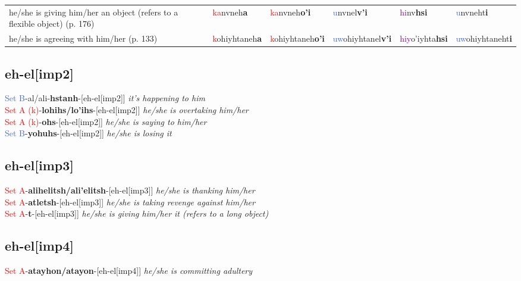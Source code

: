 \documentclass[oneside,openany]{book}%
\begin{document}
\begin{tabularx}{\textwidth}{>{\hsize=1.5\hsize\RaggedRight}X >{\hsize=0.9\hsize}X >{\hsize=0.9\hsize}X >{\hsize=0.9\hsize}X >{\hsize=0.9\hsize}X >{\hsize=0.9\hsize}X}
he/she is giving him/her an object (refers to a flexible object) (p. 176)&\textcolor{Red}{ka}nvneh\textbf{a}&\textcolor{Red}{ka}nvneh\textbf{o'i}&\textcolor{RoyalBlue}{u}nvnel\textbf{v'i}&\textcolor{Purple}{hi}nv\textbf{hsi}&\textcolor{RoyalBlue}{u}nvneht\textbf{i}\\%
he/she is agreeing with him/her (p. 133)&\textcolor{Red}{k}ohiyhtaneh\textbf{a}&\textcolor{Red}{k}ohiyhtaneh\textbf{o'i}&\textcolor{RoyalBlue}{uw}ohiyhtanel\textbf{v'i}&\textcolor{Purple}{hiy}o'iyhta\textbf{hsi}&\textcolor{RoyalBlue}{uw}ohiyhtaneht\textbf{i}\\%
\bottomrule%
\end{tabularx}%
\vspace{1em}%
\needspace{1in}%
\subsection*{eh-el[imp2]}%
\textcolor{RoyalBlue}{Set B}{-}al/ali{-}\textbf{hstanh}{-}[eh-el[imp2]] \textit{ it's happening to him} \\%
\textcolor{Red}{Set A (k)}{-}\textbf{lohihs/lo'ihs}{-}[eh-el[imp2]] \textit{ he/she is overtaking him/her} \\%
\textcolor{Red}{Set A (k)}{-}\textbf{ohs}{-}[eh-el[imp2]] \textit{ he/she is saying to him/her} \\%
\textcolor{RoyalBlue}{Set B}{-}\textbf{yohuhs}{-}[eh-el[imp2]] \textit{ he/she is losing it} \\%
\vspace{1em}%
\needspace{1in}%
\subsection*{eh-el[imp3]}%
\textcolor{Red}{Set A}{-}\textbf{alihelitsh/ali'elitsh}{-}[eh-el[imp3]] \textit{ he/she is thanking him/her} \\%
\textcolor{Red}{Set A}{-}\textbf{atletsh}{-}[eh-el[imp3]] \textit{ he/she is taking revenge against him/her} \\%
\textcolor{Red}{Set A}{-}\textbf{t}{-}[eh-el[imp3]] \textit{ he/she is giving him/her it (refers to a long object)} \\%
\vspace{1em}%
\needspace{1in}%
\subsection*{eh-el[imp4]}%
\textcolor{Red}{Set A}{-}\textbf{atayhon/atayon}{-}[eh-el[imp4]] \textit{ he/she is committing adultery} \\%
\vspace{1em}%
\needspace{3in}%
\end{document}
